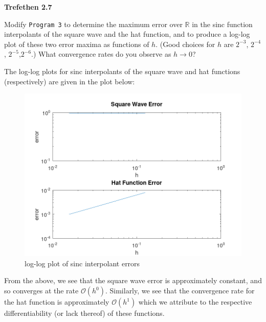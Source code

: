 \textbf{Trefethen 2.7}

Modify \texttt{Program 3} to determine the maximum error over $\mathbb{R}$ in the sinc function interpolants of the
square wave and the hat function, and to produce a log-log plot of these two error maxima as functions of $h$. 
(Good choices for $h$ are $2^{-3}$, $2^{-4}$, $2^{-5}$,$2^{-6}$.) What convergence rates do you observe as $h \to 0$?

\begin{solution}
  The log-log plots for sinc interpolants of the square wave and hat functions (respectively) are given in the plot 
  below:

  \begin{figure}[h]
    \centering
    \includegraphics[width=\textwidth]{problem_5.png}
    \caption{log-log plot of sinc interpolant errors}
  \end{figure}

  From the above, we see that the square wave error is approximately constant, and so converges at the rate
  $\mathcal{O}(h^0)$. Similarly, we see that the convergence rate for the hat function is approximately 
  $\mathcal{O}(h^1)$ which we attribute to the respective differentiability (or lack thereof) of these functions.
  \ \\
\end{solution}
